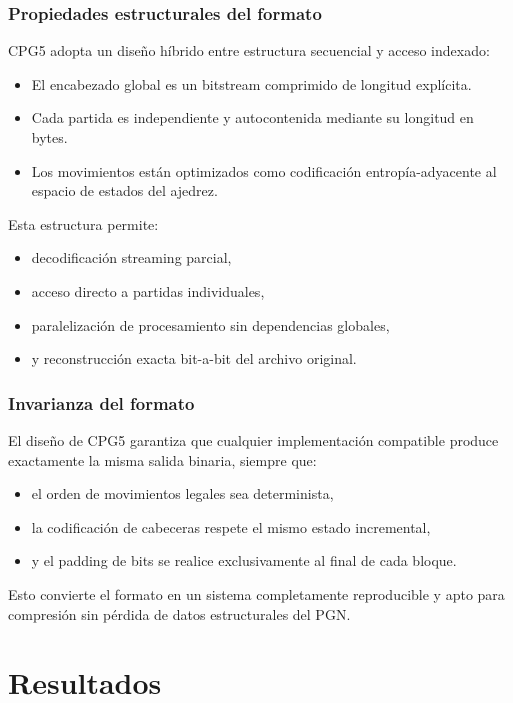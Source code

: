 \documentclass[11pt, letterpaper]{article}
\begin{document}
\subsubsection{Propiedades estructurales del formato}

CPG5 adopta un diseño híbrido entre estructura secuencial y acceso indexado:

\begin{itemize}
\item El encabezado global es un bitstream comprimido de longitud explícita.
\item Cada partida es independiente y autocontenida mediante su longitud en bytes.
\item Los movimientos están optimizados como codificación entropía-adyacente al espacio de estados del ajedrez.
\end{itemize}

Esta estructura permite:

\begin{itemize}
\item decodificación streaming parcial,
\item acceso directo a partidas individuales,
\item paralelización de procesamiento sin dependencias globales,
\item y reconstrucción exacta bit-a-bit del archivo original.
\end{itemize}

\subsubsection{Invarianza del formato}

El diseño de CPG5 garantiza que cualquier implementación compatible produce exactamente la misma salida binaria, siempre que:

\begin{itemize}
\item el orden de movimientos legales sea determinista,
\item la codificación de cabeceras respete el mismo estado incremental,
\item y el padding de bits se realice exclusivamente al final de cada bloque.
\end{itemize}

Esto convierte el formato en un sistema completamente reproducible y apto para compresión sin pérdida de datos estructurales del PGN.

\section{Resultados}
\end{document}
